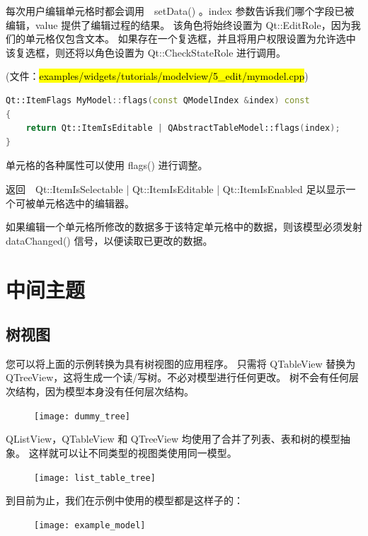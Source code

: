 每次用户编辑单元格时都会调用　setData() 。index 参数告诉我们哪个字段已被编辑，value 提供了编辑过程的结果。
该角色将始终设置为 Qt::EditRole，因为我们的单元格仅包含文本。
如果存在一个复选框，并且将用户权限设置为允许选中该复选框，则还将以角色设置为 Qt::CheckStateRole 进行调用。

(文件：\hl{examples/widgets/tutorials/modelview/5\_edit/mymodel.cpp})

\begin{lstlisting}[language=C++]
Qt::ItemFlags MyModel::flags(const QModelIndex &index) const
{
    return Qt::ItemIsEditable | QAbstractTableModel::flags(index);
}
\end{lstlisting}

单元格的各种属性可以使用 flags() 进行调整。

返回　Qt::ItemIsSelectable | Qt::ItemIsEditable | Qt::ItemIsEnabled 足以显示一个可被单元格选中的编辑器。

如果编辑一个单元格所修改的数据多于该特定单元格中的数据，则该模型必须发射　dataChanged() 信号，以便读取已更改的数据。

\section{中间主题}

\subsection{树视图}

您可以将上面的示例转换为具有树视图的应用程序。
只需将 QTableView 替换为 QTreeView，这将生成一个读/写树。不必对模型进行任何更改。
树不会有任何层次结构，因为模型本身没有任何层次结构。

\begin{figure}[hbt!]  
\texttt{[image: dummy\_tree]}
\end{figure}


QListView，QTableView 和 QTreeView 均使用了合并了列表、表和树的模型抽象。
这样就可以让不同类型的视图类使用同一模型。

\begin{figure}[hbt!]  
\texttt{[image: list\_table\_tree]}
\end{figure}

到目前为止，我们在示例中使用的模型都是这样子的：

\begin{figure}[hbt!]  
\texttt{[image: example\_model]}
\end{figure}

